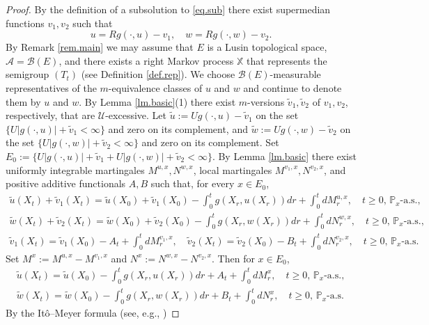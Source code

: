 \documentclass[11pt,a4paper,reqno]{amsart}
\theoremstyle{definition}
\numberwithin{equation}{section}
\begin{document}
\begin{proof}
By the definition of a subsolution to \eqref{eq.sub} there exist supermedian functions  $v_1, v_2$ such that
\[
u=R g(\cdot,u)-v_1, \quad w=R g(\cdot,w)-v_2.
\]
By Remark \ref{rem.main} we may assume that $E$ is a Lusin topological space, 
$\mathcal A=\mathcal B(E)$, and  there exists a right Markov process $\mathbb X$  that represents 
the semigroup $(T_t)$ (see Definition \ref{def.rep}).   
We choose $\mathcal B(E)$-measurable representatives of the $m$-equivalence classes of $u$ and $w$
and continue to denote them by  $u$ and $w$. By Lemma \ref{lm.basic}(1)
there exist $m$-versions $\tilde v_1,\tilde v_2$ of $v_1,v_2$, respectively, that are $\mathcal U$-excessive.
Let $\tilde u:= Ug(\cdot,u)-\tilde v_1$ on the set $\{U|g(\cdot,u)|+\tilde v_1<\infty\}$ and zero on its complement, and
$\tilde w:= Ug(\cdot,w)-\tilde v_2$ on the set $\{U|g(\cdot,w)|+\tilde v_2<\infty\}$ and zero on its complement.
Set $E_0:=\{U|g(\cdot,u)|+\tilde v_1+U|g(\cdot,w)|+\tilde v_2<\infty\}$.
By  Lemma \ref{lm.basic} there exist  uniformly integrable  martingales  
$M^{u,x}, N^{w,x}$, local martingales $M^{v_1,x}, N^{v_2,x}$,  
and positive additive functionals  $A,B$ such  that, for every $x\in E_0$,
$$
\begin{gathered}
\tilde u\left(X_t\right)+\tilde v_1(X_t)=\tilde u\left(X_0\right)+\tilde v_1\left(X_0\right)-\int_0^t g\left(X_r,  u\left(X_r\right)\right) dr
+\int_0^tdM^{u,x}_r, \quad t \geq 0,\,\mathbb P_x\text{-a.s.}, \\
\tilde w\left(X_t\right)+\tilde v_2(X_t)=\tilde w\left(X_0\right)+\tilde v_2(X_0)-\int_0^t g\left(X_r,  w\left(X_r\right)\right) d r
+\int_0^t dN^{w,x}_r, \quad t \geq 0,\,\mathbb P_x\text{-a.s.},\\
\tilde v_1\left(X_t\right)=\tilde v_1\left(X_0\right)-A_t+\int_0^tdM^{v_1,x}_r, \quad 
\tilde v_2\left(X_t\right)=\tilde v_2\left(X_0\right)-B_t+\int_0^t dN^{v_2,x}_r, \quad t \geq 0,\,\mathbb P_x\text{-a.s.}
\end{gathered}
$$
Set $M^x:= M^{u,x}-M^{v_1,x}$ and $N^x:= N^{w,x}-N^{v_2,x}$.
Then for $x\in E_0$,
$$
\begin{gathered}
\tilde u\left(X_t\right)=\tilde u\left(X_0\right)-\int_0^t g\left(X_r,  u\left(X_r\right)\right) dr
+A_t+\int_0^tdM^{x}_r, \quad t \geq 0,\,\mathbb P_x\text{-a.s.}, \\
\tilde w\left(X_t\right)=\tilde w\left(X_0\right)-\int_0^t g\left(X_r, w\left(X_r\right)\right) d r
+B_t+\int_0^t dN^{x}_r, \quad t \geq 0,\,\mathbb P_x\text{-a.s.}
\end{gathered}
$$
By the It\^o--Meyer formula (see, e.g., \cite[Theorem IV.70]{Protter})

\end{proof}
\end{document}
